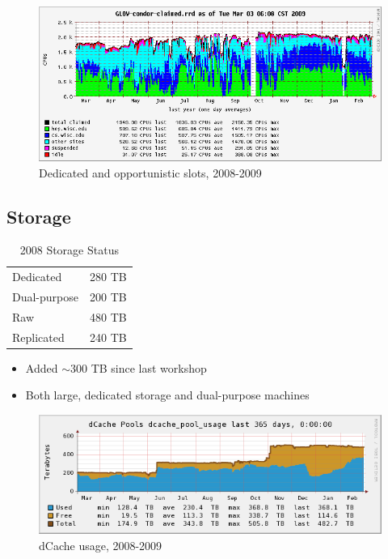 \documentclass{beamer}
\newcommand{\ca}{\ensuremath{\sim}}
\begin{document}
\begin{frame}
\begin{figure}
    \includegraphics[width=\textwidth]{Graphics/GLOW-condor-claimed-1yr.png}
    \caption{Dedicated and opportunistic slots, 2008-2009}
\end{figure}
\end{frame}

\subsection{Storage}
\begin{frame}
\begin{table}
\begin{tabular}{lr}
    \toprule
    Dedicated       &   280 TB \\   %
    Dual-purpose    &   200 TB \\   %
    \midrule
    Raw             &   480 TB \\
    Replicated      &   240 TB \\
    \bottomrule
\end{tabular}
\caption{2008 Storage Status}
\label{2008_storage_status}
\end{table}

\begin{itemize}
    \item Added \ca{}300 TB since last workshop
    \item Both large, dedicated storage and dual-purpose machines
\end{itemize}
\end{frame}

\begin{frame}
\begin{figure}
    \includegraphics[width=\textwidth]{Graphics/dcache-usage-1yr.png}
    \caption{dCache usage, 2008-2009}
\end{figure}
\end{frame}
\end{document}
